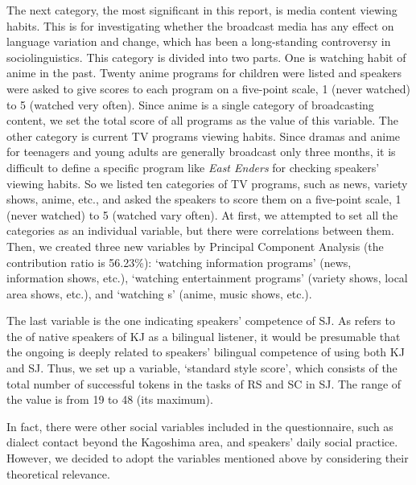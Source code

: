\documentclass[output=paper]{LSP/langsci}
\begin{document}
\largerpage[-1]
The next category, the most significant in this report, is media content viewing habits. This is for investigating whether the broadcast media has any effect on language variation and change, which has been a long-standing controversy in sociolinguistics. This category is divided into two parts. One is watching habit of anime in the past. Twenty anime programs for children were listed and speakers were asked to give scores to each program on a five-point scale, 1 (never watched) to 5 (watched very often). Since anime is a single category of broadcasting content, we set the total score of all programs as the value of this variable. The other category is current TV programs viewing habits. Since dramas and anime for teenagers and young adults are generally broadcast only three months, it is difficult to define a specific program like \textit{East Enders} for checking speakers’ viewing habits. So we listed ten categories of TV programs, such as news, variety shows, anime, etc., and asked the speakers to score them on a five-point scale, 1 (never watched) to 5 (watched vary often). At first, we attempted to set all the categories as an individual variable, but there were correlations between them. Then, we created three new variables by Principal Component Analysis (the contribution ratio is 56.23\%): ‘watching information programs’ (news, information shows, etc.), ‘watching entertainment programs’ (variety shows, local area shows, etc.), and ‘watching s’ (anime, music shows, etc.).  

The last variable is the one indicating speakers’ competence of SJ. As \citet[324]{kubozono_tonal_2007} refers to the  of native speakers of KJ as a bilingual listener, it would be presumable that the ongoing  is deeply related to speakers’ bilingual competence of using both KJ and SJ. Thus, we set up a variable, ‘standard style score’, which consists of the total number of successful tokens in the tasks of RS and SC in SJ. The range of the value is from 19 to 48 (its maximum).

In fact, there were other social variables included in the questionnaire, such as dialect contact beyond the Kagoshima area, and speakers’ daily social practice. However, we decided to adopt the variables mentioned above by considering their theoretical relevance. 
\end{document}
